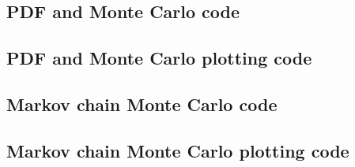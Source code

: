 \documentclass[twocolumn]{myarticle}
\begin{document}
\subsection{PDF and Monte Carlo code}
\label{subsec:pdf_and_monte_carlo_code}


\vspace{10pt}

\subsection{PDF and Monte Carlo plotting code}
\label{subsec:pdf_and_monte_carlo_plotting_code}


\vspace{10pt}

\subsection{Markov chain Monte Carlo code}
\label{subsec:markov_chain_monte_carlo_code}


\vspace{10pt}

\subsection{Markov chain Monte Carlo plotting code}
\label{subsec:markov_chain_monte_carlo_plotting_code}


\vspace{10pt}
\end{document}
